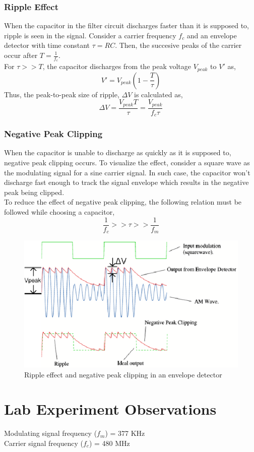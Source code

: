 \documentclass{lab_sheet}
\begin{document}
\subsubsection*{Ripple Effect}
When the capacitor in the filter circuit discharges faster than it is supposed to, ripple is seen in the signal. Consider a carrier frequency $f_c$ and an envelope detector with time constant $\tau=RC$. Then, the succesive peaks of the carrier occur after $T=\frac{1}{f_c}$.
\\
For $\tau >> T$, the capacitor discharges from the peak voltage $V_{peak}$ to $V'$ as, $$V'=V_{peak}\left(1-\frac{T}{\tau}\right)$$Thus, the peak-to-peak size of ripple, $\Delta V$ is calculated as,
$$\Delta V=\frac{V_{peak}T}{\tau}=\frac{V_{peak}}{f_c \tau}$$
\subsubsection*{Negative Peak Clipping}
When the capacitor is unable to discharge as quickly as it is supposed to, negative peak clipping occurs. To visualize the effect, consider a square wave as the modulating signal for a sine carrier signal. In such case, the capacitor won't discharge fast enough to track the signal envelope which results in the negative peak being clipped. \\
To reduce the effect of negative peak clipping, the following relation must be followed while choosing a capacitor,
$$
\frac{1}{f_c}>>\tau>>\frac{1}{f_m}
$$
\begin{figure}[H]
    \centering
    \includegraphics[scale=0.8]{Figures/negclip.png}
    \caption{Ripple effect and negative peak clipping in an envelope detector}
    \label{fig:neg}
\end{figure}
\section{Lab Experiment Observations}
Modulating signal frequency ($f_m$) = 377 KHz\\
Carrier signal frequency ($f_c$) = 480 MHz 
\end{document}
